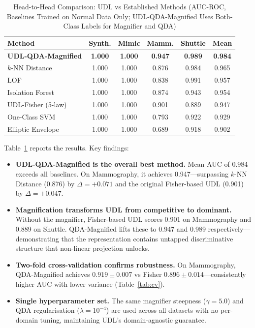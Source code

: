 \documentclass[journal]{IEEEtran}
\begin{document}
\begin{table}[t]
\centering
\caption{Head-to-Head Comparison: UDL vs Established Methods (AUC-ROC, Baselines Trained on Normal Data Only; UDL-QDA-Magnified Uses Both-Class Labels for Magnifier and QDA)}
\label{tab:sota}
\begin{tabular}{@{}lccccc@{}}
\toprule
\textbf{Method} & \textbf{Synth.} & \textbf{Mimic} & \textbf{Mamm.} & \textbf{Shuttle} & \textbf{Mean} \\
\midrule
\textbf{UDL-QDA-Magnified} & \textbf{1.000} & \textbf{1.000} & \textbf{0.947} & \textbf{0.989} & \textbf{0.984} \\
\midrule
$k$-NN Distance~\cite{ramaswamy2000efficient} & 1.000 & 1.000 & 0.876 & 0.984 & 0.965 \\
LOF~\cite{breunig2000lof} & 1.000 & 1.000 & 0.838 & 0.991 & 0.957 \\
Isolation Forest~\cite{liu2008isolation} & 1.000 & 1.000 & 0.874 & 0.943 & 0.954 \\
UDL-Fisher (5-law) & 1.000 & 1.000 & 0.901 & 0.889 & 0.947 \\
One-Class SVM~\cite{scholkopf2001estimating} & 1.000 & 1.000 & 0.793 & 0.922 & 0.929 \\
Elliptic Envelope~\cite{rousseeuw1999fast} & 1.000 & 1.000 & 0.689 & 0.918 & 0.902 \\
\bottomrule
\end{tabular}
\end{table}

Table~\ref{tab:sota} reports the results. Key findings:

\begin{itemize}
  \item \textbf{UDL-QDA-Magnified is the overall best method.} Mean AUC of 0.984 exceeds all baselines. On Mammography, it achieves 0.947---surpassing $k$-NN Distance (0.876) by $\Delta{=}+0.071$ and the original Fisher-based UDL (0.901) by $\Delta{=}+0.047$.
  \item \textbf{Magnification transforms UDL from competitive to dominant.} Without the magnifier, Fisher-based UDL scores 0.901 on Mammography and 0.889 on Shuttle. QDA-Magnified lifts these to 0.947 and 0.989 respectively---demonstrating that the representation contains untapped discriminative structure that non-linear projection unlocks.
  \item \textbf{Two-fold cross-validation confirms robustness.} On Mammography, QDA-Magnified achieves $0.919 \pm 0.007$ vs Fisher $0.896 \pm 0.014$---consistently higher AUC with lower variance (Table~\ref{tab:cv}).
  \item \textbf{Single hyperparameter set.} The same magnifier steepness ($\gamma{=}5.0$) and QDA regularisation ($\lambda{=}10^{-4}$) are used across all datasets with no per-domain tuning, maintaining UDL's domain-agnostic guarantee.
\end{itemize}
\end{document}

